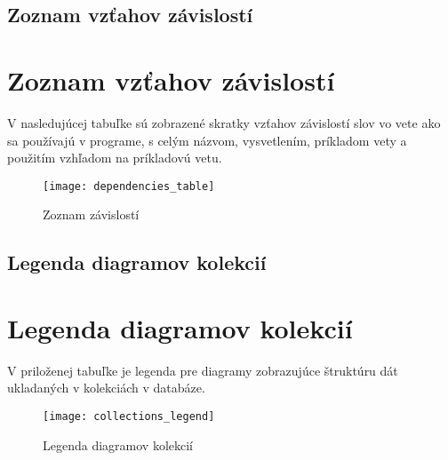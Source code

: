 \newpage
{}
{
	\section{Zoznam vzťahov závislostí}
}
{
	\chapter{Zoznam vzťahov závislostí}
}
V nasledujúcej tabuľke sú zobrazené skratky vzťahov závislostí slov vo vete ako sa používajú v programe, s celým názvom, vysvetlením, príkladom vety a použitím vzhľadom na príkladovú vetu.

\begin{figure}[H]
	\begin{center}\texttt{[image: dependencies\_table]}\end{center}
	\caption[Zoznam závislotí]{Zoznam závislostí}\label{fig:dependencies_table}
\end{figure}

\newpage
{}
{
	\section{Legenda diagramov kolekcií}
}
{
	\chapter{Legenda diagramov kolekcií}
}
V priloženej tabuľke je legenda pre diagramy zobrazujúce štruktúru dát ukladaných v kolekciách v databáze.

\begin{figure}[H]
	\begin{center}\texttt{[image: collections\_legend]}\end{center}
	\caption[Legenda diagramov kolekcií]{Legenda diagramov kolekcií}\label{fig:collections_legend}
\end{figure}

